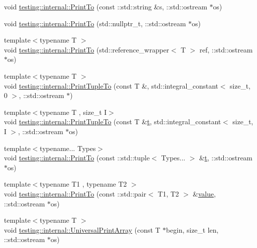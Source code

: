 \begin{DoxyCompactItemize}
\item 
void \mbox{\hyperlink{namespacetesting_1_1internal_af59b4f5d83276cd807c45063b14bad44}{testing\+::internal\+::\+Print\+To}} (const \+::std\+::string \&s, \+::std\+::ostream $\ast$os)
\item 
void \mbox{\hyperlink{namespacetesting_1_1internal_a76f564cf23190dbd5c9e088defdd092b}{testing\+::internal\+::\+Print\+To}} (std\+::nullptr\+\_\+t, \+::std\+::ostream $\ast$os)
\item 
{\footnotesize template$<$typename T $>$ }\\void \mbox{\hyperlink{namespacetesting_1_1internal_a5587d09db034bc597870ae86bd8c01f8}{testing\+::internal\+::\+Print\+To}} (std\+::reference\+\_\+wrapper$<$ T $>$ ref, \+::std\+::ostream $\ast$os)
\item 
{\footnotesize template$<$typename T $>$ }\\void \mbox{\hyperlink{namespacetesting_1_1internal_a7174fbf5d6ba458afae675022c9aae1e}{testing\+::internal\+::\+Print\+Tuple\+To}} (const T \&, std\+::integral\+\_\+constant$<$ size\+\_\+t, 0 $>$, \+::std\+::ostream $\ast$)
\item 
{\footnotesize template$<$typename T , size\+\_\+t I$>$ }\\void \mbox{\hyperlink{namespacetesting_1_1internal_a3580971ab4571dc9a00f4ed0e17fd777}{testing\+::internal\+::\+Print\+Tuple\+To}} (const T \&\mbox{\hyperlink{_mutual_8h_a978d88b393c8a37dc2614c88788b3442}{t}}, std\+::integral\+\_\+constant$<$ size\+\_\+t, I $>$, \+::std\+::ostream $\ast$os)
\item 
{\footnotesize template$<$typename... Types$>$ }\\void \mbox{\hyperlink{namespacetesting_1_1internal_a5628347cba9a345f56087fdb70930fc8}{testing\+::internal\+::\+Print\+To}} (const \+::std\+::tuple$<$ Types... $>$ \&\mbox{\hyperlink{_mutual_8h_a978d88b393c8a37dc2614c88788b3442}{t}}, \+::std\+::ostream $\ast$os)
\item 
{\footnotesize template$<$typename T1 , typename T2 $>$ }\\void \mbox{\hyperlink{namespacetesting_1_1internal_af2c33928facbf2edf7af564278724d98}{testing\+::internal\+::\+Print\+To}} (const \+::std\+::pair$<$ T1, T2 $>$ \&\mbox{\hyperlink{_obj__test_2lib_2googletest-master_2googlemock_2test_2gmock-matchers__test_8cc_a337b8a670efc0b086ad3af163f3121b6}{value}}, \+::std\+::ostream $\ast$os)
\item 
{\footnotesize template$<$typename T $>$ }\\void \mbox{\hyperlink{namespacetesting_1_1internal_ad79d71c3110f8eb24ab352d68f29436a}{testing\+::internal\+::\+Universal\+Print\+Array}} (const T $\ast$begin, size\+\_\+t len, \+::std\+::ostream $\ast$os)

\end{DoxyCompactItemize}
